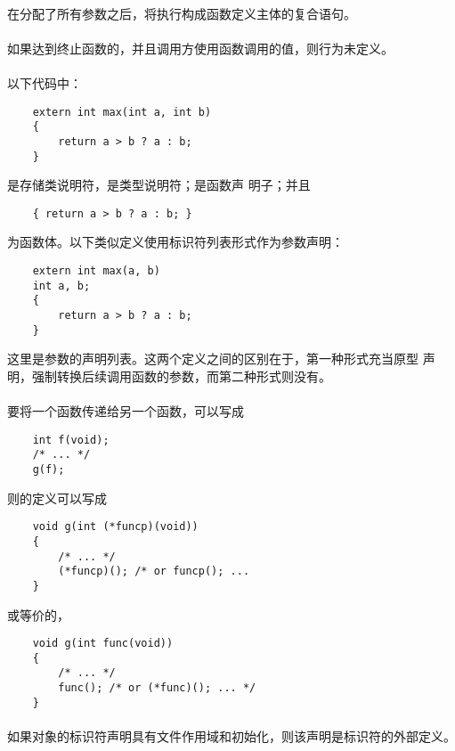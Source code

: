 \paragraph{}
在分配了所有参数之后，将执行构成函数定义主体的复合语句。

\paragraph{}
如果达到终止函数的\tm{\}}，并且调用方使用函数调用的值，则行为未定义。

\paragraph{}
\ex 以下代码中：
\begin{lstlisting}
    extern int max(int a, int b)
    {
        return a > b ? a : b;
    }
\end{lstlisting}
是存储类说明符，是类型说明符；是函数声
明子；并且
\begin{lstlisting}
    { return a > b ? a : b; }
\end{lstlisting}
为函数体。以下类似定义使用标识符列表形式作为参数声明：
\begin{lstlisting}
    extern int max(a, b)
    int a, b;
    {
        return a > b ? a : b;
    }
\end{lstlisting}
这里是参数的声明列表。这两个定义之间的区别在于，第一种形式充当原型
声明，强制转换后续调用函数的参数，而第二种形式则没有。

\paragraph{}
\ex 要将一个函数传递给另一个函数，可以写成
\begin{lstlisting}
    int f(void);
    /* ... */
    g(f);
\end{lstlisting}
则的定义可以写成
\begin{lstlisting}
    void g(int (*funcp)(void))
    {
        /* ... */
        (*funcp)(); /* or funcp(); ...
    }
\end{lstlisting}
或等价的，
\begin{lstlisting}
    void g(int func(void))
    {
        /* ... */
        func(); /* or (*func)(); ... */
    }
\end{lstlisting}

\semantic
\paragraph{}
如果对象的标识符声明具有文件作用域和初始化，则该声明是标识符的外部定义。

